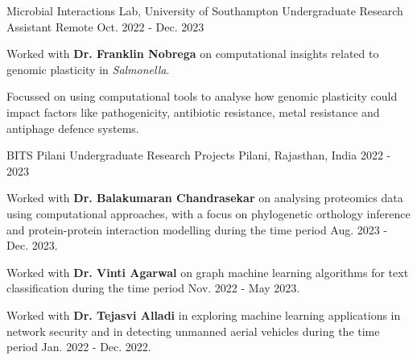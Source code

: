 \begin{cventries}
  \cventry
    {Microbial Interactions Lab, University of Southampton} %
    {Undergraduate Research Assistant} %
    {Remote} %
    {Oct. 2022 - Dec. 2023} %
    {
      \begin{cvitems}
        \item{Worked with \textbf{Dr. Franklin Nobrega} on computational insights
        related to genomic plasticity in \emph{Salmonella}.}
        \item{Focussed on using computational tools to analyse how genomic plasticity
        could impact factors like pathogenicity, antibiotic resistance, metal resistance
        and antiphage defence systems.}
      \end{cvitems}
    }

  \cventry
    {BITS Pilani} %
    {Undergraduate Research Projects} %
    {Pilani, Rajasthan, India} %
    {2022 - 2023} %
    {
      \begin{cvitems}
        \item{Worked with \textbf{Dr. Balakumaran Chandrasekar} on analysing proteomics data
        using computational approaches, with a focus on phylogenetic orthology inference and
        protein-protein interaction modelling during the time period Aug. 2023 - Dec. 2023.}
        \item{Worked with \textbf{Dr. Vinti Agarwal} on graph machine learning algorithms for
        text classification during the time period Nov. 2022 - May 2023.}
        \item{Worked with \textbf{Dr. Tejasvi Alladi} in exploring machine learning
        applications in network security and in detecting unmanned aerial vehicles
        during the time period Jan. 2022 - Dec. 2022.}
      \end{cvitems}
    }

\end{cventries}


